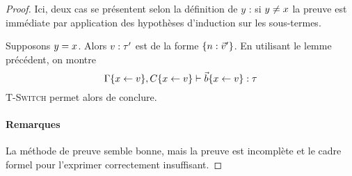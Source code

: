 \begin{lemma}
\begin{proof}
Ici, deux cas se présentent selon la définition de $y$ : si $y \neq x$ la
preuve est immédiate par application des hypothèses d'induction sur les
sous-termes. 

Supposons $y = x$. Alors $v : \tau'$ est de la forme $\{n : \vec{v}'\}$.
En utilisant le lemme précédent, on montre
$$\Gamma \{ x \leftarrow v \}, C \{ x \leftarrow v \}  \vdash \vec{b} \{ x \leftarrow v \} : \tau$$
\textsc{T-Switch} permet alors de conclure.

\paragraph{Remarques} La méthode de preuve semble bonne, mais la preuve est
  incomplète et le cadre formel pour l'exprimer correctement insuffisant.

\end{proof}
\end{lemma}

